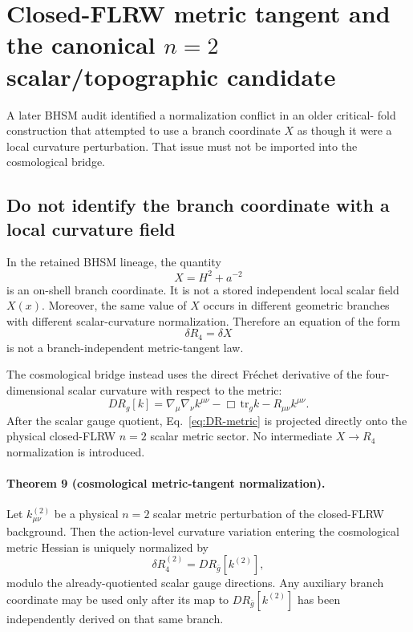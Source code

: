 \section{Closed-FLRW metric tangent and the canonical $n=2$ scalar/topographic candidate}
\label{sec:closed-flrw-metric-tangent}

A later BHSM audit identified a normalization conflict in an older critical-
fold construction that attempted to use a branch coordinate $X$ as though it
were a local curvature perturbation.  That issue must not be imported into
the cosmological bridge.

\subsection{Do not identify the branch coordinate with a local curvature field}

In the retained BHSM lineage, the quantity
\begin{equation}
X=H^2+a^{-2}
\end{equation}
is an on-shell branch coordinate.  It is not a stored independent local
scalar field $X(x)$.  Moreover, the same value of $X$ occurs in different
geometric branches with different scalar-curvature normalization.  Therefore
an equation of the form
\begin{equation}
\delta R_4=\delta X
\end{equation}
is not a branch-independent metric-tangent law.

The cosmological bridge instead uses the direct Fr\'echet derivative of the
four-dimensional scalar curvature with respect to the metric:
\begin{equation}
\boxed{
D R_g[k]
=
\nabla_\mu\nabla_\nu k^{\mu\nu}
-
\Box\,\mathrm{tr}_g k
-
R_{\mu\nu}k^{\mu\nu}.
}
\label{eq:DR-metric}
\end{equation}
After the scalar gauge quotient, Eq.~\eqref{eq:DR-metric} is projected
directly onto the physical closed-FLRW $n=2$ scalar metric sector.  No
intermediate $X\to R_4$ normalization is introduced.

\paragraph{Theorem 9 (cosmological metric-tangent normalization).}
Let $k_{\mu\nu}^{(2)}$ be a physical $n=2$ scalar metric perturbation of the
closed-FLRW background.  Then the action-level curvature variation entering
the cosmological metric Hessian is uniquely normalized by
\begin{equation}
\delta R_4^{(2)}
=
D R_{\bar g}[k^{(2)}],
\end{equation}
modulo the already-quotiented scalar gauge directions.  Any auxiliary branch
coordinate may be used only after its map to
$D R_{\bar g}[k^{(2)}]$ has been independently derived on that same branch.

